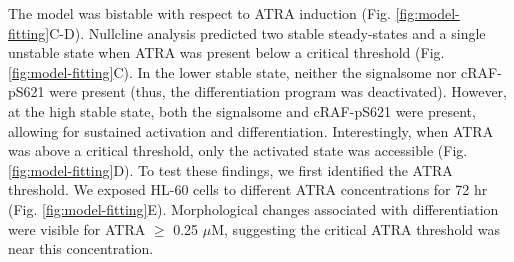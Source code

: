 \documentclass[10pt,twocolumn,twoside,final]{IEEEtran}
\begin{document}
The model was bistable with respect to ATRA induction (Fig. \ref{fig:model-fitting}C-D).
Nullcline analysis predicted two stable steady-states and a single unstable state when ATRA was present below a critical threshold (Fig. \ref{fig:model-fitting}C).
In the lower stable state, neither the signalsome nor cRAF-pS621 were present (thus, the differentiation program was deactivated).
However, at the high stable state, both the signalsome and cRAF-pS621 were present, allowing for sustained activation and differentiation.
Interestingly, when ATRA was above a critical threshold, only the activated state was accessible (Fig. \ref{fig:model-fitting}D).
To test these findings, we first identified the ATRA threshold. We exposed HL-60 cells to different ATRA concentrations for 72 hr (Fig. \ref{fig:model-fitting}E).
Morphological changes associated with differentiation were visible for ATRA $\geq$ 0.25 $\mu$M, suggesting the critical ATRA
threshold was near this concentration.

\end{document}
